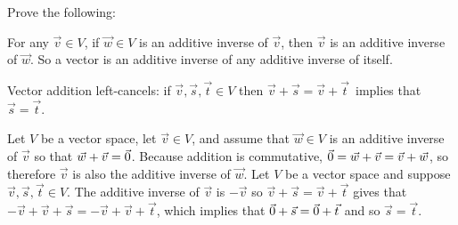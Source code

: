 
\begin{Exercise}[
name={},
title={}, 
difficulty=0,
origin={\cite{JH}}]

Prove the following:

\Question For any $\vec{v}\in V$, if $\vec{w}\in V$ is an additive
        inverse of $\vec{v}$, then $\vec{v}$ is an additive inverse of
        $\vec{w}$.
        So a vector is an additive inverse of any additive inverse of
        itself.

\Question Vector addition left-cancels: if
        \( \vec{v},\vec{s},\vec{t}\in V \)
        then \( \vec{v}+\vec{s}=\vec{v}+\vec{t}\, \) implies
        that \( \vec{s}=\vec{t} \).

\end{Exercise}

\begin{Answer}

\Question Let \( V \) be a vector space,
          let \( \vec{v}\in V \), and
          assume that \( \vec{w}\in V \) is an additive inverse of $\vec{v}$
          so that \( \vec{w}+\vec{v}=\vec{0} \).
          Because addition is commutative,
          \( \vec{0}=\vec{w}+\vec{v}=\vec{v}+\vec{w} \),
          so therefore \( \vec{v} \) is also
          the additive inverse of \( \vec{w} \).
\Question Let \( V \) be a vector space and suppose
          \( \vec{v},\vec{s},\vec{t}\in V \).
          The additive inverse of \( \vec{v} \) is \( -\vec{v} \) so
          \( \vec{v}+\vec{s}=\vec{v}+\vec{t} \) gives that
          \( -\vec{v}+\vec{v}+\vec{s}=-\vec{v}+\vec{v}+\vec{t} \),
          which implies that \( \vec{0}+\vec{s}=\vec{0}+\vec{t} \) and so
          \( \vec{s}=\vec{t} \).


\end{Answer}
